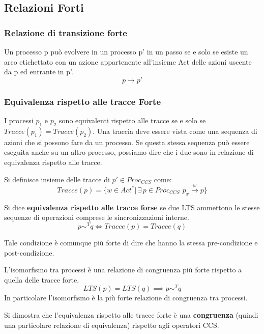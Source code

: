 \subsection{Relazioni Forti}
\subsubsection{Relazione di transizione forte}
\begin{definizione}
  Un processo p può evolvere in un processo p’ in un passo se e solo se esiste un arco
etichettato con un azione appartenente all’insieme Act delle azioni uscente da p ed entrante in
p'.
\[p \to p'\]
\end{definizione}
\subsubsection{Equivalenza rispetto alle tracce Forte}
I processi $p_1$ e $p_2$ sono equivalenti rispetto alle tracce se e solo se $Tracce(p_1) = Tracce(p_2)$.
Una traccia deve essere vista come una sequenza di azioni che si possono fare da un processo.
Se questa stessa sequenza può essere eseguita anche su un altro processo, possiamo dire che i
due sono in relazione di equivalenza rispetto alle tracce. 
\begin{definizione}
Si definisce insieme delle tracce di $p'\in Proc_{CCS}$ come:
    \[Tracce(p)=\{w\in Act^*|\,\exists\, p\in Proc_{CCS}
    \,\, p_x\stackrel{w}{\rightarrow} p\}\]
\end{definizione}
\begin{definizione}
  Si dice \textbf{equivalenza rispetto alle tracce forse} se due LTS ammettono le stesse sequenze di operazioni comprese le sincronizzazioni interne.
    \[p\sim^T q\iff Tracce(p)=Tracce(q)\]
  \begin{nota}
     Tale condizione è comunque più forte di dire che hanno la stessa pre-condizione e post-condizione.
  \end{nota}
  \begin{corollario}
  L'isomorfismo tra processi è una relazione di congruenza più forte rispetto a quella delle tracce forte.
     \[LTS(p)=LTS(q)\implies p\sim^T q\]
     In particolare l'isomorfismo è la più forte relazione di congruenza tra processi.
  \end{corollario}
\end{definizione} \vspace{5mm} %
\begin{definizione}
  Si dimostra che l'equivalenza rispetto alle tracce forte è una
  \textbf{congruenza} (quindi una particolare relazione di equivalenza) rispetto agli operatori CCS.
\end{definizione} \vspace{5mm} %
